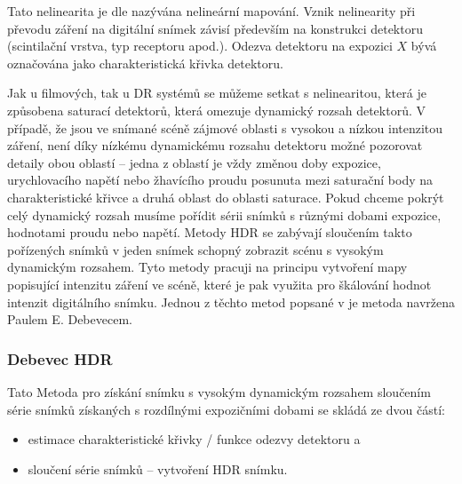 Tato nelinearita je dle \cite{Debevec} nazývána nelineární mapování. Vznik nelinearity při převodu záření na digitální snímek závisí především na konstrukci detektoru (scintilační vrstva, typ receptoru apod.). \cite{Debevec}
Odezva detektoru na expozici $X$ bývá označována jako charakteristická křivka detektoru.

Jak u filmových, tak u DR systémů se můžeme setkat s nelinearitou, která je způsobena saturací detektorů, která omezuje dynamický rozsah detektorů. V případě, že jsou ve snímané scéně zájmové oblasti s vysokou a nízkou intenzitou záření, není díky nízkému dynamickému rozsahu detektoru možné pozorovat detaily obou oblastí -- jedna z oblastí je vždy změnou doby expozice, urychlovacího napětí nebo žhavícího proudu posunuta mezi saturační body na charakteristické křivce a druhá oblast do oblasti saturace. Pokud chceme pokrýt celý dynamický rozsah musíme pořídit sérii snímků s různými dobami expozice, hodnotami proudu nebo napětí. Metody HDR se zabývají sloučením takto pořízených snímků v jeden snímek schopný zobrazit scénu s vysokým dynamickým rozsahem. 
Tyto metody pracuji na principu vytvoření mapy popisující intenzitu záření ve scéně, které je pak využita pro škálování hodnot intenzit digitálního snímku. 
Jednou z těchto metod popsané v \cite{Debevec} je metoda navržena Paulem E. Debevecem.

\subsubsection{Debevec HDR}
Tato Metoda pro získání snímku s vysokým dynamickým rozsahem sloučením série snímků získaných s rozdílnými expozičními dobami se skládá ze dvou částí:

\begin{itemize}
\item estimace charakteristické křivky / funkce odezvy detektoru a
\item sloučení série snímků -- vytvoření HDR snímku.
\end{itemize}
